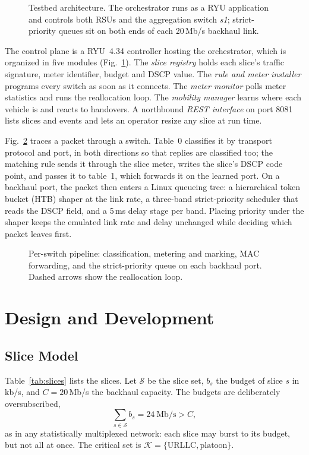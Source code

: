 \documentclass[conference]{IEEEtran}
\begin{document}
\begin{figure}[t]
\centering
\resizebox{0.96\textwidth}{!}{}
\caption{Testbed architecture. The orchestrator runs as a RYU application and controls both RSUs and the aggregation switch \emph{s1}; strict-priority queues sit on both ends of each 20\,Mb/s backhaul link.}
\label{fig:arch}
\end{figure}

The control plane is a RYU~4.34 controller hosting the orchestrator, which is organized in five modules (Fig.~\ref{fig:arch}). The \emph{slice registry} holds each slice's traffic signature, meter identifier, budget and DSCP value. The \emph{rule and meter installer} programs every switch as soon as it connects. The \emph{meter monitor} polls meter statistics and runs the reallocation loop. The \emph{mobility manager} learns where each vehicle is and reacts to handovers. A northbound \emph{REST interface} on port 8081 lists slices and events and lets an operator resize any slice at run time.

Fig.~\ref{fig:pipeline} traces a packet through a switch. Table~0 classifies it by transport protocol and port, in both directions so that replies are classified too; the matching rule sends it through the slice meter, writes the slice's DSCP code point, and passes it to table~1, which forwards it on the learned port. On a backhaul port, the packet then enters a Linux queueing tree: a hierarchical token bucket (HTB) shaper at the link rate, a three-band strict-priority scheduler that reads the DSCP field, and a 5\,ms delay stage per band. Placing priority under the shaper keeps the emulated link rate and delay unchanged while deciding which packet leaves first.

\begin{figure}[t]
\centering
\resizebox{\columnwidth}{!}{}
\caption{Per-switch pipeline: classification, metering and marking, MAC forwarding, and the strict-priority queue on each backhaul port. Dashed arrows show the reallocation loop.}
\label{fig:pipeline}
\end{figure}

\section{Design and Development}

\subsection{Slice Model}
Table~\ref{tab:slices} lists the slices. Let $\mathcal{S}$ be the slice set, $b_s$ the budget of slice $s$ in kb/s, and $C=20$\,Mb/s the backhaul capacity. The budgets are deliberately oversubscribed,
\begin{equation}
\textstyle\sum_{s\in\mathcal{S}} b_s = 24\ \text{Mb/s} > C ,
\label{eq:oversub}
\end{equation}
as in any statistically multiplexed network: each slice may burst to its budget, but not all at once. The critical set is $\mathcal{K}=\{\text{URLLC},\text{platoon}\}$.
\end{document}
